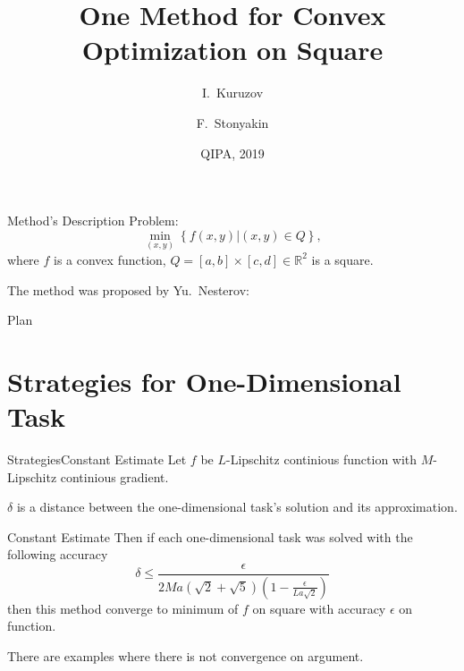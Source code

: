 \documentclass{beamer}
\title{One Method for Convex Optimization on Square}
\author{I.~Kuruzov\inst{1} \and F.~Stonyakin\inst{1, 2}}
\institute[MIPT] %
{
  \inst{1}%
Moscow Institut of Physics and Technology
  \and
  \inst{2}%
V.I.~Vernandsky Crimean Federal University
}
\date{QIPA, 2019}
\begin{document}
\begin{frame}
  \titlepage
\end{frame}


\begin{frame}{Method's Description}
Problem:
$$\min_{(x,y)}\left\{f(x,y)|(x,y) \in Q\right\},$$
where $f$ is a convex function, $Q = [a,b]\times[c, d]\in \mathbb{R}^2$ is a square.

The method was proposed by Yu.~Nesterov:
\pause

\end{frame}

\begin{frame}{Plan}
  \tableofcontents
\end{frame}


\section{Strategies for One-Dimensional Task}

\begin{frame}{Strategies}{Constant Estimate}
Let $f$ be $L$-Lipschitz continious function with $M$-Lipschitz continious gradient.

$\delta$ is a distance between the one-dimensional task's solution and its approximation.
\begin{block}{Constant Estimate}
Then if each one-dimensional task was solved with the following accuracy
$$\boxed{\delta \leq \frac{\epsilon}{2Ma(\sqrt{2}+\sqrt{5})(1-\frac{\epsilon}{La\sqrt{2}})}}$$
then this method converge to minimum of $f$ on square with accuracy $\epsilon$ on function.
\end{block}
\pause
There are examples where there is not convergence on argument.
\end{frame}
\end{document}

